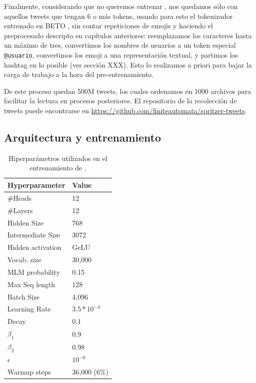 Finalmente, considerando que no queremos entrenar , nos quedamos sólo con aquellos tweets que tengan 6 o más tokens, usando para esto el tokenizador entrenado en BETO \cite{canete2020spanish}, sin contar repeticiones de emojis y haciendo el preprocesado descripto en capítulos anteriores: reemplazamos los caracteres hasta un máximo de tres, convertimos los nombres de usuarios a un token especial \verb|@usuario|, convertimos los emoji a una representación textual, y partimos los hashtag en lo posible (ver sección XXX). Esto lo realizamos a priori para bajar la carga de trabajo a la hora del pre-entrenamiento.

De este proceso quedan 500M tweets, los cuales ordenamos en 1000 archivos para facilitar la lectura en procesos posteriores. El repositorio de la recolección de tweets puede encontrarse en \url{https://github.com/finiteautomata/spritzer-tweets}.


\subsection{Arquitectura y entrenamiento}

\begin{table}[t]
    \centering
    \begin{tabular}{l|l}
        \hline
        Hyperparameter  & Value \\
        \hline
        \#Heads           & 12             \\
        \#Layers          & 12             \\
        Hidden Size       & 768            \\
        Intermediate Size & 3072           \\
        Hidden activation & GeLU           \\
        Vocab. size       & 30,000         \\
        \hline
        MLM probability   & 0.15           \\
        Max Seq length    & 128            \\
        Batch Size        & 4,096          \\
        Learning Rate     & $3.5 * 10^{-4}$\\
        Decay             & $0.1$          \\
        $\beta_1$         & 0.9            \\
        $\beta_2$         & 0.98           \\
        $\epsilon$        & $10^{-6}$      \\
        Warmup steps      & 36,000 (6\%)   \\
        \hline
    \end{tabular}
    \caption{Hiperparámetros utilizados en el entrenamiento de \robertuito{}.}
    \label{tab:robertuito_architecture}
\end{table}

